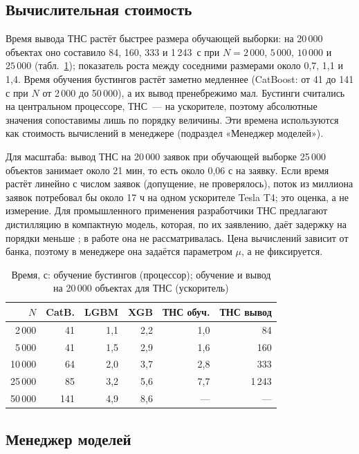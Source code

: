 \documentclass{misisarticle}
\begin{document}
\subsection{Вычислительная стоимость}

Время вывода ТНС растёт быстрее размера обучающей выборки: на 20\,000 объектах оно составило 84, 160, 333 и 1\,243~с при $N=2\,000$, $5\,000$, $10\,000$ и $25\,000$ (табл.~\ref{tab:time}); показатель роста между соседними размерами около 0,7, 1,1 и 1,4. Время обучения бустингов растёт заметно медленнее (CatBoost: от 41 до 141 с при $N$ от 2\,000 до 50\,000), а их вывод пренебрежимо мал. Бустинги считались на центральном процессоре, ТНС~--- на ускорителе, поэтому абсолютные значения сопоставимы лишь по порядку величины. Эти времена используются как стоимость вычислений в менеджере (подраздел «Менеджер моделей»).

Для масштаба: вывод ТНС на 20\,000 заявок при обучающей выборке 25\,000 объектов занимает около 21 мин, то есть около 0,06 с на заявку. Если время растёт линейно с числом заявок (допущение, не проверялось), поток из миллиона заявок потребовал бы около 17 ч на одном ускорителе Tesla T4; это оценка, а не измерение. Для промышленного применения разработчики ТНС предлагают дистилляцию в компактную модель, которая, по их заявлению, даёт задержку на порядки меньше \cite{tabpfn25}; в работе она не рассматривалась. Цена вычислений зависит от банка, поэтому в менеджере она задаётся параметром $\mu$, а не фиксируется.

\begin{table}[t]
\caption{Время, с: обучение бустингов (процессор); обучение и вывод на 20\,000 объектах для ТНС (ускоритель)}
\label{tab:time}
\centering
\small
\setlength{\tabcolsep}{3pt}
\begin{tabular}{rrrrrr}
\toprule
$N$ & CatB. & LGBM & XGB & ТНС обуч. & ТНС вывод \\
\midrule
2\,000 & 41 & 1,1 & 2,2 & 1,0 & 84 \\
5\,000 & 41 & 1,5 & 2,9 & 1,6 & 160 \\
10\,000 & 64 & 2,0 & 3,7 & 2,8 & 333 \\
25\,000 & 85 & 3,2 & 5,6 & 7,7 & 1\,243 \\
50\,000 & 141 & 4,9 & 8,6 & --- & --- \\
\bottomrule
\end{tabular}
\end{table}

\subsection{Менеджер моделей}
\end{document}
